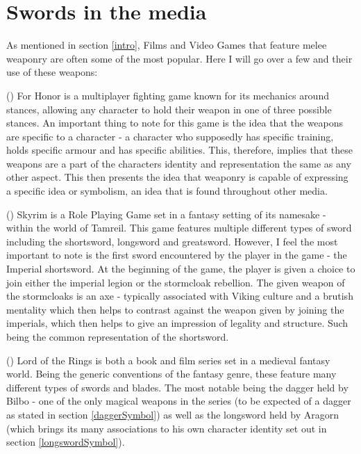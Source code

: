 \documentclass{article}
\begin{document}
\section{Swords in the media} \label{media}
As mentioned in section \ref{intro}, Films and Video Games that feature melee weaponry are often some of the most popular. Here I will go over a few and their use of these weapons:
\begin{list}{---}{}
    \item ()
    For Honor is a multiplayer fighting game known for its mechanics around stances, allowing any character to hold their weapon in one of three possible stances. An important thing to note for this game is the idea that the weapons are specific to a character - a character who supposedly has specific training, holds specific armour and has specific abilities. This, therefore, implies that these weapons are a part of the characters identity and representation the same as any other aspect. This then presents the idea that weaponry is capable of expressing a specific idea or symbolism, an idea that is found throughout other media.
    \item ()
    Skyrim is a Role Playing Game set in a fantasy setting of its namesake - within the world of Tamreil. This game features multiple different types of sword including the shortsword, longsword and greatsword. However, I feel the most important to note is the first sword encountered by the player in the game - the Imperial shortsword. At the beginning of the game, the player is given a choice to join either the imperial legion or the stormcloak rebellion. The given weapon of the stormcloaks is an axe - typically associated with Viking culture and a brutish mentality which then helps to contrast against the weapon given by joining the imperials, which then helps to give an impression of legality and structure. Such being the common representation of the shortsword.
    \item ()
    Lord of the Rings is both a book and film series set in a medieval fantasy world. Being the generic conventions of the fantasy genre, these feature many different types of swords and blades. The most notable being the dagger held by Bilbo - one of the only magical weapons in the series (to be expected of a dagger as stated in section \ref{daggerSymbol}) as well as the longsword held by Aragorn (which brings its many associations to his own character identity set out in section \ref{longswordSymbol}).
\end{list}
\end{document}

